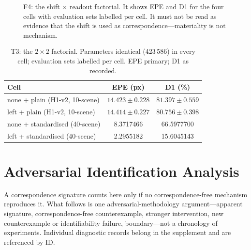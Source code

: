 \documentclass[conference]{IEEEtran}
\begin{document}
\begin{figure}[t]
\centering
{}
\caption{F4: the shift $\times$ readout factorial. It shows EPE and D1 for the four cells with evaluation sets labelled per cell. It must not be read as evidence that the shift is used as correspondence---materiality is not mechanism.}
\label{fig:f4}
\end{figure}

\begin{table}[t]
\centering
\caption{T3: the $2\times2$ factorial. Parameters identical (423\,586) in every cell; evaluation sets labelled per cell. EPE primary; D1 as recorded.}
\label{tab:t3}
\begin{tabular}{lcc}
\toprule
Cell & EPE (px) & D1 (\%) \\
\midrule
none + plain (H1-v2, 10-scene) & $14.423 \pm 0.228$ & $81.397 \pm 0.559$ \\
left + plain (H1-v2, 10-scene) & $14.414 \pm 0.227$ & $80.756 \pm 0.398$ \\
none + standardised (40-scene) & 8.3717466 & 66.5977700 \\
left + standardised (40-scene) & 2.2955182 & 15.6045143 \\
\bottomrule
\end{tabular}
\end{table}

\section{Adversarial Identification Analysis}
\label{sec:pillar3}

A correspondence signature counts here only if no correspondence-free mechanism reproduces it. What follows is one adversarial-methodology argument---apparent signature, correspondence-free counterexample, stronger intervention, new counterexample or identifiability failure, boundary---not a chronology of experiments. Individual diagnostic records belong in the supplement and are referenced by ID.
\end{document}
